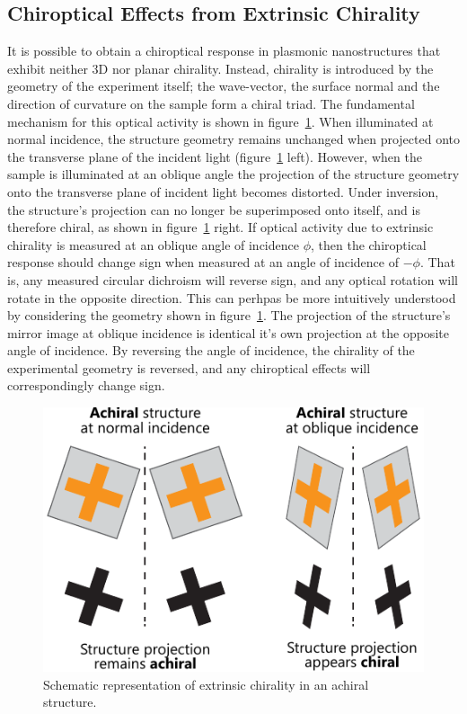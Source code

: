 \subsection{Chiroptical Effects from Extrinsic Chirality}\label{sec:background:Chirality:extrinsic}
It is possible to obtain a chiroptical response in plasmonic nanostructures that exhibit neither 3D nor planar chirality. Instead, chirality is introduced by the geometry of the experiment itself; the wave-vector, the surface normal and the direction of curvature on the sample form a chiral triad. 
The fundamental mechanism for this optical activity is shown in figure~\ref{fig:background:Chirality:extrinsic}. When illuminated at normal incidence, the structure geometry remains unchanged when projected onto the transverse plane of the incident light (figure~\ref{fig:background:Chirality:extrinsic} left). However, when the sample is illuminated at an oblique angle the projection of the structure geometry onto the transverse plane of incident light becomes distorted. Under inversion, the structure's projection can no longer be superimposed onto itself, and is therefore chiral, as shown in figure~\ref{fig:background:Chirality:extrinsic} right. 
If optical activity due to extrinsic chirality is measured at an oblique angle of incidence $\phi$, then the chiroptical response should change sign when measured at an angle of incidence of $-\phi$. That is, any measured circular dichroism will reverse sign, and any optical rotation will rotate in the opposite direction. This can perhpas be more intuitively understood by considering the geometry shown in figure~\ref{fig:background:Chirality:extrinsic}. The projection of the structure's mirror image at oblique incidence is identical it's own projection at the opposite angle of incidence. By reversing the angle of incidence, the chirality of the experimental geometry is reversed, and any chiroptical effects will correspondingly change sign.
\begin{figure}[htb!]
    \centering
    \includegraphics[scale=1.0]{./figures/background/chiroptics/extrinsic_chirality.pdf}
    \caption{\label{fig:background:Chirality:extrinsic}Schematic representation of extrinsic chirality in an achiral structure.}
\end{figure}
